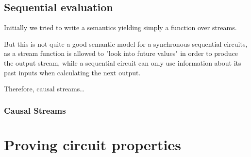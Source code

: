         \subsection{Sequential evaluation}
        \label{subsec:sequential-eval}
            Initially we tried to write a semantics yielding simply a function over streams.

            But this is not quite a good semantic model for a synchronous sequential circuits,
            as a stream function is allowed to "look into future values" in order to produce
            the output stream, while a sequential circuit can only use information about its past inputs
            when calculating the next output.

            Therefore, causal streams\ldots

            \subsubsection{Causal Streams}

    \section{Proving circuit properties}
    \label{sec:proving-circuit-properties}
